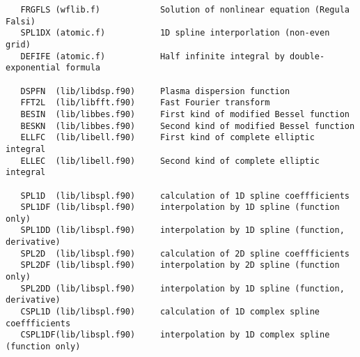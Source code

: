 \begin{verbatim}
   FRGFLS (wflib.f)            Solution of nonlinear equation (Regula Falsi)
   SPL1DX (atomic.f)           1D spline interporlation (non-even grid)
   DEFIFE (atomic.f)           Half infinite integral by double-exponential formula

   DSPFN  (lib/libdsp.f90)     Plasma dispersion function
   FFT2L  (lib/libfft.f90)     Fast Fourier transform
   BESIN  (lib/libbes.f90)     First kind of modified Bessel function
   BESKN  (lib/libbes.f90)     Second kind of modified Bessel function
   ELLFC  (lib/libell.f90)     First kind of complete elliptic integral
   ELLEC  (lib/libell.f90)     Second kind of complete elliptic integral

   SPL1D  (lib/libspl.f90)     calculation of 1D spline coeffficients
   SPL1DF (lib/libspl.f90)     interpolation by 1D spline (function only)
   SPL1DD (lib/libspl.f90)     interpolation by 1D spline (function, derivative)
   SPL2D  (lib/libspl.f90)     calculation of 2D spline coeffficients
   SPL2DF (lib/libspl.f90)     interpolation by 2D spline (function only)
   SPL2DD (lib/libspl.f90)     interpolation by 1D spline (function, derivative)
   CSPL1D (lib/libspl.f90)     calculation of 1D complex spline coeffficients
   CSPL1DF(lib/libspl.f90)     interpolation by 1D complex spline (function only)

\end{verbatim}
